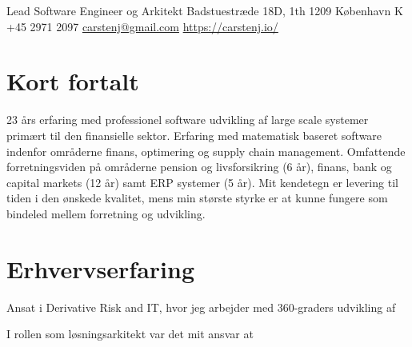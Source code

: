 \documentclass[10pt, a4paper]{article}
\begin{document}
{Lead Software Engineer og Arkitekt}
{Badstuestræde 18D, 1th}
{1209 København K}
{+45 2971 2097}
{\href{mailto:carstenj@gmail.com}{carstenj@gmail.com}}
{\href{https://carstenj.io/}{https://carstenj.io/}}
\section{Kort fortalt}
23 års erfaring med professionel software udvikling af large scale systemer primært til den finansielle sektor. Erfaring med matematisk baseret software indenfor områderne finans, optimering og supply chain management. Omfattende forretningsviden på områderne pension og livsforsikring (6 år), finans, bank og capital markets (12 år) samt ERP systemer (5 år). Mit kendetegn er levering til tiden i den ønskede kvalitet, mens min største styrke er at kunne fungere som bindeled mellem forretning og udvikling.

\section{Erhvervserfaring}

{Ansat i Derivative Risk and IT, hvor jeg arbejder med 360-graders udvikling af}
{
}

{I rollen som løsningsarkitekt var det mit ansvar at}
{
}
\end{document}
